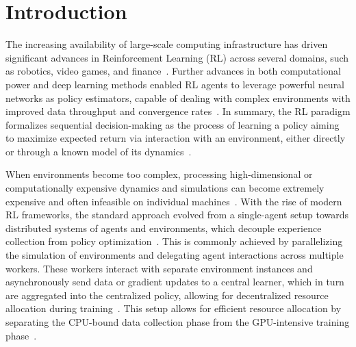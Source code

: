 
\chapter{Introduction}
\label{ch:introduction}

The increasing availability of large-scale computing infrastructure has driven significant advances
in Reinforcement Learning (RL) across several domains, such as robotics, video games, and finance~\citep{Yin2024,Hou2025,Huh2023}.
Further advances in both computational power and deep learning methods enabled RL agents to leverage powerful neural networks
as policy estimators, capable of dealing with complex environments with improved data throughput and convergence rates~\citep{Zheng2023,Jia2024}.
In summary, the RL paradigm formalizes sequential decision-making as the process of learning a policy aiming to maximize expected return
via interaction with an environment, either directly or through a known model of its dynamics~\citep{Zhu2022}.

When environments become too complex, processing high-dimensional or computationally expensive dynamics and simulations
can become extremely expensive and often infeasible on individual machines~\citep{Goudarzi2023,Fan2024}.
With the rise of modern RL frameworks, the standard approach evolved from a single-agent setup towards
distributed systems of agents and environments, which decouple experience collection from policy optimization~\citep{Furukawa2022,Kopic2024}.
This is commonly achieved by parallelizing the simulation of environments and delegating agent interactions across multiple workers.
These workers interact with separate environment instances and asynchronously send data or gradient updates to a central learner,
which in turn are aggregated into the centralized policy, allowing for decentralized resource allocation during training~\citep{Cho2023}.
This setup allows for efficient resource allocation by separating the CPU-bound data collection phase from the GPU-intensive training phase~\citep{Fayaz2022,Lu2021}.

